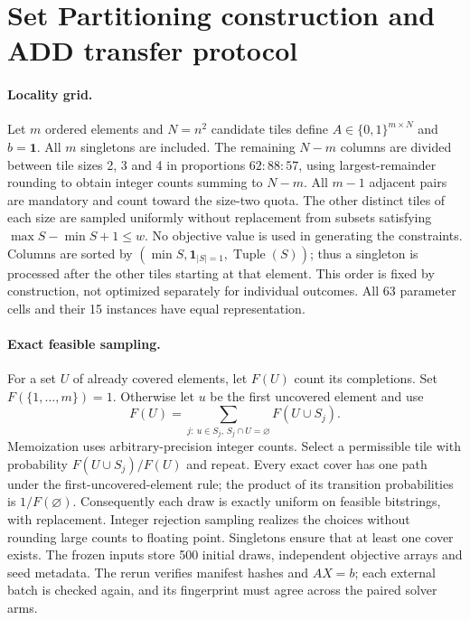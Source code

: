 \section{Set Partitioning construction and ADD transfer protocol}
\label{app:partition_protocol}
\paragraph{Locality grid.}
Let $m$ ordered elements and $N=n^2$ candidate tiles define $A\in\{0,1\}^{m\times N}$
and $b=\mathbf1$. All $m$ singletons are included. The remaining $N-m$ columns
are divided between tile sizes 2, 3 and 4 in proportions $62:88:57$, using
largest-remainder rounding to obtain integer counts summing to $N-m$.
All $m-1$ adjacent pairs are mandatory and count toward the size-two quota.
The other distinct tiles of each size are sampled uniformly without replacement
from subsets satisfying $\max S-\min S+1\leq w$. No objective value is used
in generating the constraints. Columns are sorted by
$(\min S,\mathbf1_{|S|=1},\operatorname{Tuple}(S))$; thus a singleton is
processed after the other tiles starting at that element. This order is fixed
by construction, not optimized separately for individual outcomes.
All 63 parameter cells and their 15 instances have equal representation.

\paragraph{Exact feasible sampling.}
For a set $U$ of already covered elements, let $F(U)$ count its completions.
Set $F(\{1,\ldots,m\})=1$. Otherwise let $u$ be the first uncovered element and use
\begin{equation}
F(U)=\sum_{j:\ u\in S_j,\,S_j\cap U=\varnothing}F(U\cup S_j).
\label{eq:partition_counting}
\end{equation}
Memoization uses arbitrary-precision integer counts. Select a permissible tile
with probability $F(U\cup S_j)/F(U)$ and repeat. Every exact cover has one path
under the first-uncovered-element rule; the product of its transition
probabilities is $1/F(\varnothing)$. Consequently each draw is exactly uniform
on feasible bitstrings, with replacement. Integer rejection sampling realizes
the choices without rounding large counts to floating point. Singletons ensure
that at least one cover exists. The frozen inputs store 500 initial draws,
independent objective arrays and seed metadata. The rerun verifies manifest
hashes and $AX=b$; each external batch is checked again, and its fingerprint
must agree across the paired solver arms.

